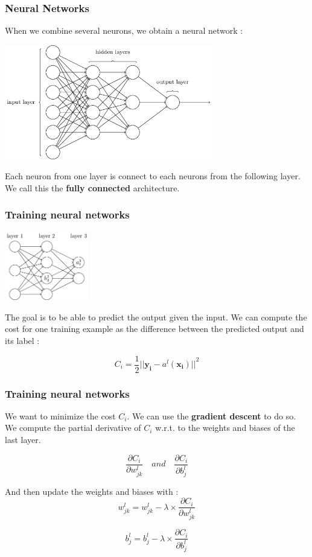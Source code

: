 \documentclass{beamer}
\begin{document}
\begin{frame}
  \frametitle{Neural Networks}
  When we combine several neurons, we obtain a neural network :

  \begin{center}
    \includegraphics[height=5cm]{img/nn_full.png}
  \end{center}

  Each neuron from one layer is connect to each neurons from the following
  layer. We call this the \textbf{fully connected} architecture.
\end{frame}

\begin{frame}
  \frametitle{Training neural networks}
  \begin{center}
    \includegraphics[height=3cm]{img/nn_basic.png}
  \end{center}
  The goal is to be able to predict the output given the input. We can compute
  the cost for one training example as the difference between the predicted
  output and its label :

  \begin{equation}
    C_i = \frac{1}{2}
    {\lvert \lvert \boldsymbol{y_i} - a^l(\boldsymbol{x_i}) \rvert \rvert}^2
  \end{equation}
\end{frame}

\begin{frame}
  \frametitle{Training neural networks}
  We want to minimize the cost $C_i$. We can use the \textbf{gradient descent}
  to do so. We compute the partial derivative of $C_i$ w.r.t. to the weights and
  biases of the last layer.

  \begin{equation}
    \frac{\partial C_i}{\partial w_{jk}^l} \quad and \quad
    \frac{\partial C_i}{\partial b_j^l}
  \end{equation}

  And then update the weights and biases with :
  \begin{equation}
    w_{jk}^l = w_{jk}^l - \lambda \times\frac{\partial C_i}{\partial w_{jk}^l}
  \end{equation}

  \begin{equation}
    b_j^l = b_j^l - \lambda \times\frac{\partial C_i}{\partial b_j^l}
  \end{equation}
\end{frame}
\end{document}
